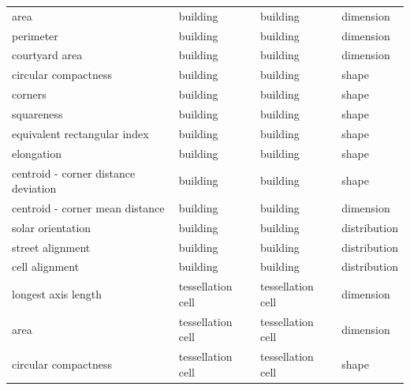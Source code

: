\begin{longtable}{p{5cm}p{4cm}p{4cm}l}
    \bottomrule
    \endlastfoot
                                    area &                        building &                   building &    dimension \\
                               perimeter &                        building &                   building &    dimension \\
                          courtyard area &                        building &                   building &    dimension \\
                    circular compactness &                        building &                   building &        shape \\
                                 corners &                        building &                   building &        shape \\
                              squareness &                        building &                   building &        shape \\
            equivalent rectangular index &                        building &                   building &        shape \\
                              elongation &                        building &                   building &        shape \\
    centroid - corner distance deviation &                        building &                   building &        shape \\
         centroid - corner mean distance &                        building &                   building &    dimension \\
                       solar orientation &                        building &                   building & distribution \\
                        street alignment &                        building &                   building & distribution \\
                          cell alignment &                        building &                   building & distribution \\
                     longest axis length &               tessellation cell &          tessellation cell &    dimension \\
                                    area &               tessellation cell &          tessellation cell &    dimension \\
                    circular compactness &               tessellation cell &          tessellation cell &        shape \\

\end{longtable}
